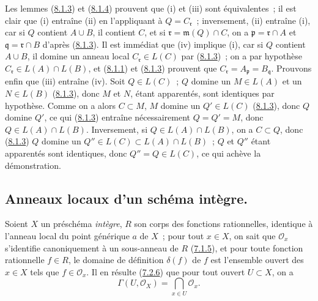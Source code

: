 Les lemmes (\hyperref[I.8.1.3-fr]{8.1.3}) et
(\hyperref[I.8.1.4-fr]{8.1.4}) prouvent que (i) et (iii) sont équivalentes~;
il est clair que (i) entraîne (ii) en l'appliquant à $Q=C_\mathfrak r$~;
inversement, (ii) entraîne (i), car si $Q$ contient $A\cup B$, il contient
$C$, et si $\mathfrak r=\mathfrak m(Q)\cap C$, on a
$\mathfrak p=\mathfrak r\cap A$ et $\mathfrak q=\mathfrak r\cap B$ d'après
(\hyperref[I.8.1.3-fr]{8.1.3}). Il est immédiat que (iv) implique (i), car si
$Q$ contient $A\cup B$, il domine un anneau local
$C_\mathfrak r\in L(C)$ par (\hyperref[I.8.1.3-fr]{8.1.3})~; on a par
hypothèse $C_\mathfrak r\in L(A)\cap L(B)$, et
(\hyperref[I.8.1.1-fr]{8.1.1}) et (\hyperref[I.8.1.3-fr]{8.1.3}) prouvent que
$C_\mathfrak r=A_\mathfrak p=B_\mathfrak q$. Prouvons enfin que (iii)
entraîne (iv). Soit $Q\in L(C)$~; $Q$ domine un $M\in L(A)$ et un
$N\in L(B)$ (\hyperref[I.8.1.3-fr]{8.1.3}), donc $M$ et $N$, étant
apparentés, sont identiques par hypothèse. Comme on a alors $C\subset M$,
$M$ domine un $Q'\in L(C)$ (\hyperref[I.8.1.3-fr]{8.1.3}), donc $Q$ domine
$Q'$, ce qui (\hyperref[I.8.1.3-fr]{8.1.3}) entraîne nécessairement
$Q=Q'=M$, donc $Q\in L(A)\cap L(B)$. Inversement, si
$Q\in L(A)\cap L(B)$, on a $C\subset Q$, donc
(\hyperref[I.8.1.3-fr]{8.1.3}) $Q$ domine un
$Q''\in L(C)\subset L(A)\cap L(B)$~; $Q$ et $Q''$ étant apparentés sont
identiques, donc $Q''=Q\in L(C)$, ce qui achève la démonstration.

\subsection{Anneaux locaux d'un schéma intègre.}
\label{subsection:I.8.2-fr}

\begin{env}[8.2.1]
\label{I.8.2.1-fr}
Soient $X$ un préschéma \emph{intègre}, $R$ son corps des fonctions
rationnelles, identique à l'anneau local du point générique $a$ de $X$~; pour
tout $x\in X$, on sait que $\mathscr{O}_x$ s'identifie canoniquement à un
sous-anneau de $R$ (\hyperref[I.7.1.5-fr]{7.1.5}), et pour toute fonction
rationnelle $f\in R$, le domaine de définition $\delta(f)$ de $f$ est
l'ensemble ouvert des $x\in X$ tels que $f\in\mathscr{O}_x$. Il en résulte
(\hyperref[I.7.2.6-fr]{7.2.6}) que pour tout ouvert $U\subset X$, on a
\begin{equation}
  \Gamma(U,\mathscr{O}_X)=\bigcap_{x\in U}\mathscr{O}_x.
  \tag{8.2.1.1}\label{I.8.2.1.1-fr}
\end{equation}
\end{env}


